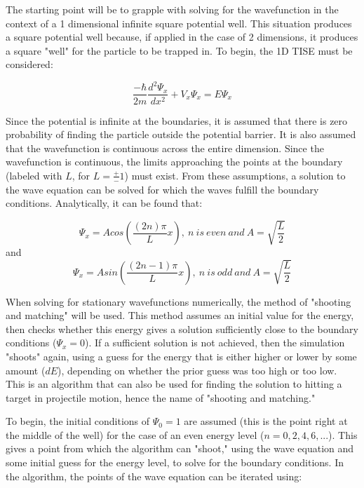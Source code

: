 \documentclass[12pt]{article}                  %
\begin{document}
The starting point will be to grapple with solving for the wavefunction in the context of a 1 dimensional infinite square potential well. This situation produces a square potential well because, if applied in the case of 2 dimensions, it produces a  square "well" for the particle to be trapped in. To begin, the 1D TISE must be considered: 

\begin{equation}
\frac{-\hbar}{2m}\frac{d^2\Psi_{x}}{dx^2}+V_{x}\Psi_{x} = E\Psi_{x}
\label{1D TISE}
\end{equation}

Since the potential is infinite at the boundaries, it is assumed that there is zero probability of finding the particle outside the potential barrier. It is also assumed that the wavefunction is continuous across the entire dimension. Since the wavefunction is continuous, the limits approaching the points at the boundary (labeled with $L$, for $L = \frac{+}{-}1$) must exist. From these assumptions, a solution to the wave equation can be solved for which the waves fulfill the boundary conditions. Analytically, it can be found that: 


\pagebreak

\begin{equation}
\Psi_{x} = Acos(\frac{(2n)\pi}{L}x),\: n\: is\: even\: and\: A = \sqrt{\frac{L}{2}}
\label{Wavefunction Solution, even}
\end{equation}
and
\begin{equation}
\Psi_{x} = Asin(\frac{(2n-1)\pi}{L}x),\: n\: is\: odd\: and\: A = \sqrt{\frac{L}{2}}
\label{Wavefunction Solution, odd}
\end{equation}

When solving for stationary wavefunctions numerically, the method of "shooting and matching" will be used. This method assumes an initial value for the energy, then checks whether this energy gives a solution sufficiently close to the boundary conditions ($\Psi_{x} = 0$). If a sufficient solution is not achieved, then the simulation "shoots" again, using a guess for the energy that is either higher or lower by some amount ($dE$), depending on whether the prior guess was too high or too low. This is an algorithm that can also be used for finding the solution to hitting a target in projectile motion, hence the name of "shooting and matching."

To begin, the initial conditions of $\Psi_{0} = 1$ are assumed (this is the point right at the middle of the well) for the case of an even energy level ($n = 0, 2, 4, 6, ...$). This gives a point from which the algorithm can "shoot," using the wave equation and some initial guess for the energy level, to solve for the boundary conditions. In the algorithm, the points of the wave equation can be iterated using: 
\end{document}
